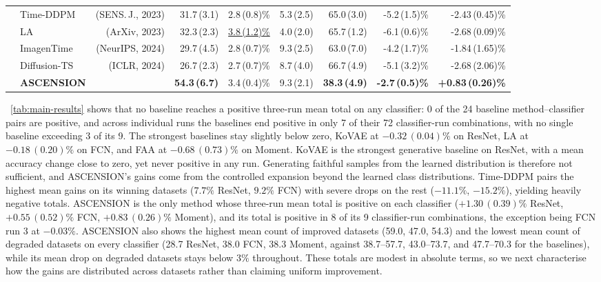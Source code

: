 \begin{table}[t]
{\begin{tabular}{@{}llrrrrrrr@{}}
 & Time-DDPM & (SENS.\,J., 2023) & 31.7\,(3.1) & 2.8\,(0.8)\% & 5.3\,(2.5) & 65.0\,(3.0) & -5.2\,(1.5)\% & -2.43\,(0.45)\% \\
 & LA & (ArXiv, 2023) & 32.3\,(2.3) & \underline{3.8\,(1.2)\%} & 4.0\,(2.0) & 65.7\,(1.2) & -6.1\,(0.6)\% & -2.68\,(0.09)\% \\
 & ImagenTime & (NeurIPS, 2024) & 29.7\,(4.5) & 2.8\,(0.7)\% & 9.3\,(2.5) & 63.0\,(7.0) & -4.2\,(1.7)\% & -1.84\,(1.65)\% \\
 & Diffusion-TS & (ICLR, 2024) & 26.7\,(2.3) & 2.7\,(0.7)\% & 8.7\,(4.0) & 66.7\,(4.9) & -5.1\,(3.2)\% & -2.68\,(2.06)\% \\
 & \textbf{ASCENSION} &  & \textbf{54.3\,(6.7)} & 3.4\,(0.4)\% & 9.3\,(2.1) & \textbf{38.3\,(4.9)} & \textbf{-2.7\,(0.5)\%} & \textbf{+0.83\,(0.26)\%} \\
\bottomrule
\end{tabular}%
}
\end{table}

\tablename~\ref{tab:main-results} shows that no baseline reaches a
positive three-run mean total on any classifier: 0 of the 24
baseline method--classifier pairs are positive, and across individual
runs the baselines end positive in only 7 of their 72 classifier-run
combinations, with no single baseline exceeding 3 of its 9. The
strongest baselines stay slightly below zero, KoVAE at
$-0.32\,(0.04)\%$ on ResNet, LA at $-0.18\,(0.20)\%$ on FCN, and FAA
at $-0.68\,(0.73)\%$ on Moment.
KoVAE is the strongest generative baseline on ResNet, with
a mean accuracy change close to zero, yet never positive in any run.
Generating faithful samples from the learned distribution is
therefore not sufficient, and ASCENSION's gains come from
the controlled expansion beyond the learned class distributions. Time-DDPM pairs the highest mean
gains on its winning datasets ($7.7\%$ ResNet, $9.2\%$ FCN) with
severe drops on the rest ($-11.1\%$, $-15.2\%$), yielding heavily
negative totals. ASCENSION is the only method whose three-run mean
total is positive on each classifier ($+1.30\,(0.39)\%$ ResNet,
$+0.55\,(0.52)\%$ FCN, $+0.83\,(0.26)\%$ Moment), and its total is
positive in 8 of its 9 classifier-run combinations, the exception
being FCN run 3 at $-0.03\%$. ASCENSION also shows the highest mean
count of improved datasets (59.0, 47.0, 54.3) and the lowest mean
count of degraded datasets on every classifier (28.7 ResNet, 38.0
FCN, 38.3 Moment, against 38.7--57.7, 43.0--73.7, and 47.7--70.3 for
the baselines), while its mean drop on degraded datasets stays below
$3\%$ throughout. These totals are modest in absolute terms, so we
next characterise how the gains are distributed across datasets
rather than claiming uniform improvement.

